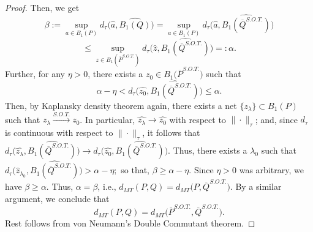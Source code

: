 \documentclass[10pt,a4paper]{amsart}
\begin{document}
\begin{proof}
Then, we get
\[
\beta := \sup_{a\in B_1(P)}d_\tau \big(\widehat{a}, \widehat{B_1(Q)}\big)=
\sup_{a\in B_1(P)}d_\tau \Big(\widehat{a},
\widehat{B_1(\overline{Q}^{S.O.T.})}\Big)\]
\[
\leq \sup_{z\in
  B_1(\overline{P}^{S.O.T.})}d_\tau\Big(\widehat{z},
\widehat{B_1(\overline{Q}^{S.O.T.})}\Big)=: \alpha.
\] 
Further, for any  $\eta>0$, there exists a $ z_{0}\in
B_1\Big(\overline{P}^{S.O.T.}\Big)$ such that
\[
\alpha-\eta<
d_\tau \Big(\widehat{z_{0}}, \widehat{B_1(\overline{Q}^{S.O.T.})}\Big)\leq
\alpha.
\]
Then, by Kaplansky density theorem again, there exists a net
$\{z_{\lambda }\} \subset B_1(P)$ such that $z_{\lambda
}\stackrel{S.O.T.}{\longrightarrow} z_{0}$. In particular,
$\widehat{z_{\lambda}} {\longrightarrow} \widehat{z_{0}}$ with respect
to $\|\cdot\|_\tau$; and, since $d_\tau$ is continuous with respect to
$\|\cdot\|_\tau$, it follows that \( d_\tau \Big(\widehat{{z}_{\lambda }},
\widehat{B_1(\overline{Q}^{S.O.T.})}\Big)\rightarrow
d_\tau\Big(\widehat{z_{0}}, \widehat{B_1(\overline{Q}^{S.O.T.})}\Big).  \)
Thus, there exists a $\lambda_{0}$ such that \( d_\tau
\Big(\widehat{z}_{\lambda_{0}}, \widehat{B_1(\overline{Q}^{S.O.T.})}\Big)>\alpha-
\eta; \) so that, $\beta \geq \alpha-\eta$. Since $\eta > 0$ was
arbitrary, we have $\beta\geq \alpha$. Thus, $\alpha=\beta$, i.e., \(
d_{MT}(P, Q)= d_{MT}\Big({P}, \overline{Q}^{S.O.T.}\Big).  \) By a similar
argument, we conclude that
\[
d_{MT}(P, Q)= d_{MT}\Big(\overline{P}^{S.O.T.}, \overline{Q}^{S.O.T.}\Big).
\]
Rest follows from von Neumann's Double
Commutant theorem.
\end{proof}
\end{document}

